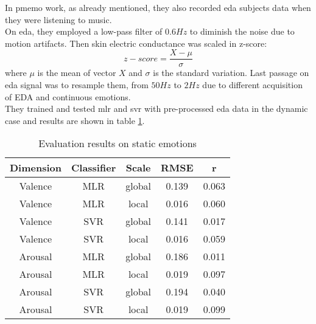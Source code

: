 In \gls{pmemo} work, as already mentioned, they also recorded \gls{eda} subjects data when they were listening to music.
\\
On \gls{eda}, they employed a low-pass filter of $0.6Hz$ to diminish the noise due to motion artifacts. Then skin electric conductance was scaled in z-score:
\begin{equation}
	z-score=\dfrac{X-\mu}{\sigma}
\end{equation}
where $\mu$ is the mean of vector $X$ and $\sigma$ is the standard variation.
Last passage on \gls{eda} signal was to resample them, from $50Hz$ to $2Hz$ due to different acquisition of EDA and continuous emotions.
\\
They trained and tested \gls{mlr} and \gls{svr} with pre-processed \gls{eda} data in the dynamic case and results are shown in table \ref{table:PMEmo_results_EDA}.
\begin{table}[h!]
	\centering
	\begin{tabular}{|c|c|c|c|c|}
		\hline
		Dimension & Classifier & Scale & RMSE & r \\ [0.5ex] 
		\hline\hline Valence & MLR & global & 0.139 & 0.063 \\
		\hline Valence & MLR & local & 0.016 & 0.060 \\
		\hline Valence & SVR & global & 0.141 & 0.017 \\
		\hline Valence & SVR & local & 0.016 & 0.059 \\
		\hline Arousal & MLR & global & 0.186 & 0.011 \\
		\hline Arousal & MLR & local & 0.019 & 0.097 \\
		\hline Arousal & SVR & global & 0.194 & 0.040 \\
		\hline Arousal & SVR & local & 0.019 & 0.099 \\
		\hline
	\end{tabular}
	\caption{Evaluation results on static emotions}
	\label{table:PMEmo_results_EDA}
\end{table}





